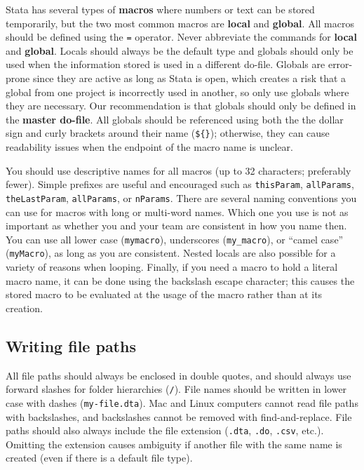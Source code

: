 Stata has several types of \textbf{macros} where numbers or text can be stored temporarily,
but the two most common macros are \textbf{local} and \textbf{global}.
All macros should be defined using the \texttt{=} operator.
Never abbreviate the commands for \textbf{local} and \textbf{global}.
Locals should always be the default type and globals should only
be used when the information stored is used in a different do-file.
Globals are error-prone since they are active as long as Stata is open,
which creates a risk that a global from one project is incorrectly used in another,
so only use globals where they are necessary.
Our recommendation is that globals should only be defined in the \textbf{master do-file}.
All globals should be referenced using both the the dollar sign and curly brackets around their name (\texttt{\$\{\}});
otherwise, they can cause readability issues when the endpoint of the macro name is unclear.

You should use descriptive names for all macros (up to 32 characters; preferably fewer).
Simple prefixes are useful and encouraged such as \texttt{thisParam}, \texttt{allParams},
\texttt{theLastParam}, \texttt{allParams}, or \texttt{nParams}.
There are several naming conventions you can use for macros with long or multi-word names.
Which one you use is not as important as whether you and your team are consistent in how you name then.
You can use all lower case (\texttt{mymacro}), underscores (\texttt{my\_macro}),
or ``camel case'' (\texttt{myMacro}), as long as you are consistent.
Nested locals are also possible for a variety of reasons when looping.
Finally, if you need a macro to hold a literal macro name,
it can be done using the backslash escape character;
this causes the stored macro to be evaluated
at the usage of the macro rather than at its creation.


\subsection{Writing file paths}

All file paths should always be enclosed in double quotes,
and should always use forward slashes for folder hierarchies (\texttt{/}).
File names should be written in lower case with dashes (\texttt{my-file.dta}).
Mac and Linux computers cannot read file paths with backslashes,
and backslashes cannot be removed with find-and-replace.
File paths should also always include the file extension
(\texttt{.dta}, \texttt{.do}, \texttt{.csv}, etc.).
Omitting the extension causes ambiguity
if another file with the same name is created
(even if there is a default file type).

